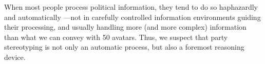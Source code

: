 \documentclass[12pt, letterpaper]{article}
\begin{document}
When most people process political information, they tend to do so haphazardly and automatically \citep{citrin1990self, lodge2013rationalizing, Sears1983, westen2006neural}---not in carefully controlled information environments guiding their processing, and usually handling more (and more complex) information than what we can convey with 50 avatars. Thus, we suspect that party stereotyping is not only an automatic process, but also a foremost reasoning device.%

\clearpage



\end{document}
